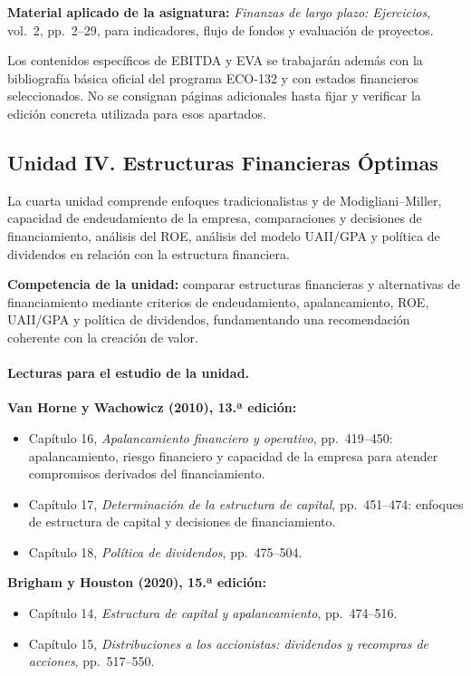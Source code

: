 \documentclass[10pt]{article}
\begin{document}
\textbf{Material aplicado de la asignatura:}
\textit{Finanzas de largo plazo: Ejercicios}, vol.~2, pp.~2--29, para
indicadores, flujo de fondos y evaluación de proyectos.
\parencite{vanhorne2010fundamentos,brigham2020fundamentos,armoa2026ejercicios}

\noindent
Los contenidos específicos de EBITDA y EVA se trabajarán además con la
bibliografía básica oficial del programa ECO-132 y con estados financieros
seleccionados. No se consignan páginas adicionales hasta fijar y verificar la
edición concreta utilizada para esos apartados.

\subsection{Unidad IV. Estructuras Financieras Óptimas}

La cuarta unidad comprende enfoques tradicionalistas y de Modigliani--Miller,
capacidad de endeudamiento de la empresa, comparaciones y decisiones de
financiamiento, análisis del ROE, análisis del modelo UAII/GPA y política de
dividendos en relación con la estructura financiera.
\parencite{uaProgramaFinanzasLargoPlazo}

\textbf{Competencia de la unidad:} comparar estructuras financieras y
alternativas de financiamiento mediante criterios de endeudamiento,
apalancamiento, ROE, UAII/GPA y política de dividendos, fundamentando una
recomendación coherente con la creación de valor.

\paragraph{Lecturas para el estudio de la unidad.}

\textbf{Van Horne y Wachowicz (2010), 13.ª edición:}
\begin{itemize}
    \item Capítulo 16, \textit{Apalancamiento financiero y operativo},
    pp.~419--450: apalancamiento, riesgo financiero y capacidad de la empresa
    para atender compromisos derivados del financiamiento.
    \item Capítulo 17, \textit{Determinación de la estructura de capital},
    pp.~451--474: enfoques de estructura de capital y decisiones de
    financiamiento.
    \item Capítulo 18, \textit{Política de dividendos}, pp.~475--504.
\end{itemize}

\textbf{Brigham y Houston (2020), 15.ª edición:}
\begin{itemize}
    \item Capítulo 14, \textit{Estructura de capital y apalancamiento},
    pp.~474--516.
    \item Capítulo 15, \textit{Distribuciones a los accionistas: dividendos y
    recompras de acciones}, pp.~517--550.
\end{itemize}
\end{document}
